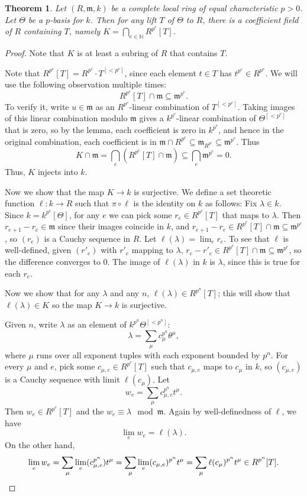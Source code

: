 \documentclass{amsart}[12pt]
\newcommand{\N}{\mathbb{N}}
\newcommand{\fm}{{\mathfrak m}}
\numberwithin{equation}{section}
\theoremstyle{plain} %
\newtheorem{thm}[equation]{Theorem}
\theoremstyle{definition}
\theoremstyle{remark}
\begin{document}
\begin{thm} Let $(R,\fm,k)$ be a complete local ring of equal characteristic $p>0$. Let $\Theta$ be a $p$-basis for $k$. Then for any lift $T$ of $\Theta$ to $R$, there is a coefficient field of $R$ containing $T$, namely $K= \bigcap_{e\in \N} R^{p^e}[T]$.
\end{thm}
\begin{proof} Note that $K$ is at least a subring of $R$ that contains $T$. 

Note that $R^{p^e}[T] = R^{p^e} \cdot T^{[<p^e]}$, since each element $t\in T$ has $t^{p^e}\in R^{p^e}$. We will use the following observation multiple times:
\begin{equation}\tag{$\clubsuit$} R^{p^e}[T] \cap \fm \subseteq \fm^{p^e}.\end{equation} To verify it, write $u\in \fm$ as an $R^{p^e}$-linear combination of $T^{[<p^e]}$. Taking images of this linear combination modulo $\fm$ gives a $k^{p^e}$-linear combination of  $\Theta^{[<p^e]}$ that is zero, so by the lemma, each coefficient is zero in $k^{p^e}$, and hence in the original combination, each coefficient is in $\fm \cap R^{p^e} \subseteq \fm_{R^{p^e}} \subseteq \fm^{p^e}$. Thus \[ K \cap \fm = \bigcap_e (R^{p^e}[T] \cap \fm) \subseteq \bigcap_e \fm^{p^e}= 0.\] Thus, $K$ injects into $k$.

Now we show that the map $K\to k$ is surjective. We define a set theoretic function $\ell: k \to R$ such that $\pi \circ \ell$ is the identity on $k$ as follows:
Fix $\lambda\in k$. Since $k=k^{p^e}[\Theta]$, for any $e$ we can pick some $r_e\in R^{p^e}[T]$ that maps to $\lambda$. Then $r_{e+1} - r_e \in \fm$ since their images coincide in $k$, and $r_{e+1}- r_e\in R^{p^e}[T] \cap \fm \subseteq \fm^{p^e}$, so $(r_e)$ is a Cauchy sequence in $R$. Let $\ell(\lambda)=\lim_e r_e$. To see that $\ell$ is well-defined, given $(r'_e)$ with $r'_e$ mapping to $\lambda$, $r_e-r'_e \in R^{p^e}[T]\cap \fm \subseteq \fm^{p^e}$, so the difference converges to $0$. The image of $\ell(\lambda)$ in $k$ is $\lambda$, since this is true for each $r_e$. 

Now we show that for any $\lambda$ and any $n$,  $\ell(\lambda) \in R^{p^n}[T]$; this will show that $\ell(\lambda)\in K$ so the map $K\to k$ is surjective.

Given $n$, write $\lambda$ as an element of $k^{p^n} \Theta^{[<p^n]}$:
\[ \lambda = \sum_\mu c^{p^n}_\mu \theta^{\mu},\]
where $\mu$ runs over all exponent tuples with each exponent bounded by $p^n$.
For every $\mu$ and $e$, pick some $c_{\mu,e}\in R^{p^e}[T]$ such that $c_{\mu,e}$ maps to $c_\mu$ in $k$, so $(c_{\mu,e})$ is a Cauchy sequence with limit $\ell(c_\mu)$. Let 
\[ w_e = \sum_\mu c^{p^n}_{\mu,e} t^{\mu}.\]
Then $w_e\in R^{p^e}[T]$ and the $w_e \equiv \lambda \mod \fm$. Again by well-definedness of $\ell$, we have
\[ \lim_e w_e = \ell(\lambda).\]
On the other hand,
\[ \lim_e w_e = \sum_\mu \lim_e (c^{p^n}_{\mu,e}) t^{\mu} = \sum_\mu \lim_e (c_{\mu,e})^{p^n} t^{\mu} =\sum_\mu \ell(c_\mu)^{p^n} t^{\mu} \in R^{p^n}[T]. \qedhere \]
\end{proof}
\end{document}
